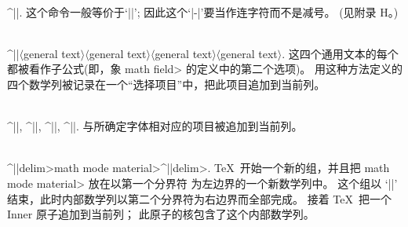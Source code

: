 \\^|\-|.\enskip
这个命令一般等价于`|\discretionary{-}{}{}|';
因此这个`|-|'要当作连字符而不是减号。 (见附录 H。)

\\^|\mathchoice|$\langle$general text$\rangle$$\langle$general
text$\rangle$$\langle$general text$\rangle$$\langle$general text$\rangle$.
这四个通用文本的每个都被看作子公式(即，象 \<math field> 的定义中的第二个选项)。%
用这种方法定义的四个数学列被记录在一个``选择项目''中，把此项目追加到当前列。

\\^|\displaystyle|, ^|\textstyle|, ^|\scriptstyle|,
^|\scriptscriptstyle|.\enskip
与所确定字体相对应的项目被追加到当前列。

\\^|\left|\<delim>\<math mode material>^|\right|\<delim>.\enskip
 \TeX\ 开始一个新的组，并且把 \<math mode material> 放在以第一个分界符%
为左边界的一个新数学列中。%
这个组以 `|\right|' 结束，此时内部数学列以第二个分界符为右边界而全部完成。%
接着 \TeX\ 把一个 Inner 原子追加到当前列；
此原子的核包含了这个内部数学列。

